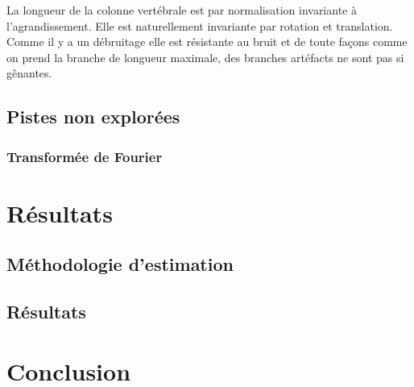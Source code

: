 \documentclass{article}
\theoremstyle{definition}
\begin{document}
      La longueur de la colonne vertébrale est par normalisation invariante à l'agrandissement. Elle est naturellement invariante par rotation et translation. Comme il y a un débruitage elle est résistante au bruit et de toute façons comme on prend la branche de longueur maximale, des branches artéfacts ne sont pas si gênantes.
    
    \subsection{Pistes non explorées}
        \subsubsection{Transformée de Fourier}  %
  
  \section{Résultats} 
  
    \subsection{Méthodologie d'estimation}  %
    
    \subsection{Résultats} %
  
  \section{Conclusion}
  
\end{document}
